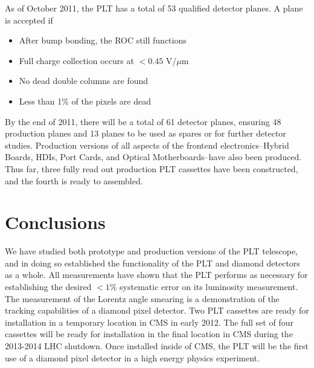\documentclass[journal]{IEEEtran}
\begin{document}
As of October 2011, the PLT has a total of 53 qualified detector planes.  A plane is accepted if 
\begin{itemize}
\item After bump bonding, the ROC still functions
\item Full charge collection occurs at $<0.45$ V/$\mu$m
\item No dead double columns are found
\item Less than 1\% of the pixels are dead
\end{itemize}
By the end of 2011, there will be a total of 61 detector planes, ensuring 48 production planes and 13 planes to be used as spares or for further detector studies.  Production versions of all aspects of the frontend electronics--Hybrid Boards, HDIs, Port Cards, and Optical Motherboards--have also been produced.  Thus far, three fully read out production PLT cassettes have been constructed, and the fourth is ready to assembled. 

%
%
\section{Conclusions}
We have studied both prototype and production versions of the PLT telescope, and in doing so established the functionality of the PLT and diamond detectors as a whole.  All measurements have shown that the PLT performs as necessary for establishing the desired $<1$\% systematic error on its luminosity measurement.   The measurement of the Lorentz angle smearing is a demonstration of the tracking capabilities of a diamond pixel detector. 
Two PLT cassettes are ready for installation in a temporary location in CMS in early 2012. The full set of four cassettes will be ready for installation in the final location in CMS during the 2013-2014 LHC shutdown.
Once installed inside of CMS, the PLT will be the first use of a diamond pixel detector in a high energy physics experiment.
\end{document}
